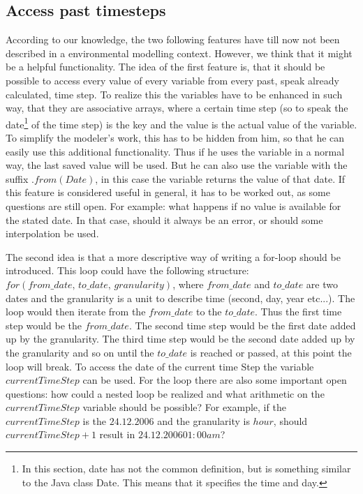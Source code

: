 \subsection{Access past timesteps}
\par
According to our knowledge, the two following features have till now not been described in a environmental modelling context. However, we think that it might be a helpful functionality.
The idea of the first feature is, that it should be possible to access every value of every variable from every past, speak already calculated, time step. To realize this the variables have to be enhanced in such way, that they are associative arrays, where a certain time step (so to speak the date\footnote{In this section, date has not the common definition, but is something similar to the Java class Date. This means that it specifies the time and day.} of the time step) is the key and the value is the actual value of the variable. To simplify the modeler’s work, this has to be hidden from him, so that he can easily use this additional functionality. Thus if he uses the variable in a normal way, the last saved value will be used. But he can also use the variable with the suffix $.from(Date)$, in this case the variable returns the value of that date. If this feature is considered useful in general, it has to be worked out, as some questions are still open. For example: what happens if no value is available for the stated date. In that case, should it always be an error, or should some interpolation be used.
\par
The second idea is that a more descriptive way of writing a for-loop should be introduced. This loop could have the following structure:\\
$for(from\_date,\, to\_date,\, granularity)$, where $from\_date$ and $to\_date$ are two dates and the granularity is a unit to describe time (second, day, year etc...). The loop would then iterate from the $from\_date$ to the $to\_date$. Thus the first time step would be the $from\_date$. The second time step would be the first date added up by the granularity. The third time step would be the second date added up by the granularity and so on until the $to\_date$ is reached or passed, at this point the loop will break. To access the date of the current time Step the variable $currentTimeStep$ can be used. For the loop there are also some important  open questions: how could a nested loop be realized and what arithmetic on the $currentTimeStep$ variable should be possible? For example, if the $currentTimeStep$ is the $24.12.2006$ and the granularity is $hour$, should $currentTimeStep+1$ result in $24.12.2006 01:00 am$?
